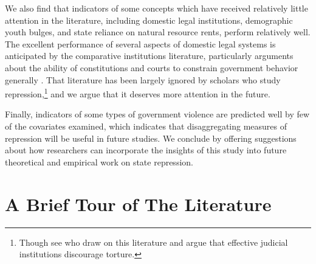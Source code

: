 \documentclass[11pt]{article}
\begin{document}
We also find that indicators of some concepts which have received relatively little attention in the literature, including domestic legal institutions, demographic youth bulges, and state reliance on natural resource rents, perform relatively well. The excellent performance of several aspects of domestic legal systems is anticipated by the comparative institutions literature, particularly arguments about the ability of constitutions and courts to constrain government behavior generally \citep[E.g.,][]{NorthWeingast1989, Ordeshook1992, Weingast1997, Carey2000, Vanberg2005, ElkinsGinsburgMelton2009}. That literature has been largely ignored by scholars who study repression,\footnote{Though see \citet{PowellStaton2009} who draw on this literature and argue that effective judicial institutions discourage torture.} and we argue that it deserves more attention in the future. 

Finally, indicators of some types of government violence are predicted well by few of the covariates examined, which indicates that  disaggregating measures of repression will be useful in future studies. We conclude by offering suggestions about how researchers can incorporate the insights of this study into future theoretical and empirical work on state repression. 

\section{A Brief Tour of The Literature}
\end{document}
